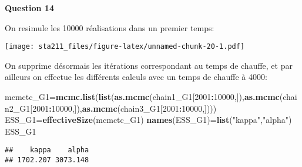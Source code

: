 \documentclass[
]{article}
\newenvironment{Shaded}{\begin{snugshade}}{\end{snugshade}}
\newcommand{\DecValTok}[1]{\textcolor[rgb]{0.00,0.00,0.81}{#1}}
\newcommand{\FloatTok}[1]{\textcolor[rgb]{0.00,0.00,0.81}{#1}}
\newcommand{\KeywordTok}[1]{\textcolor[rgb]{0.13,0.29,0.53}{\textbf{#1}}}
\newcommand{\NormalTok}[1]{#1}
\newcommand{\OperatorTok}[1]{\textcolor[rgb]{0.81,0.36,0.00}{\textbf{#1}}}
\newcommand{\StringTok}[1]{\textcolor[rgb]{0.31,0.60,0.02}{#1}}
\begin{document}
\textbf{Question 14}

On resimule les 10000 réalisations dans un premier temps:

\begin{Shaded}
\end{Shaded}

\texttt{[image: sta211\_files/figure-latex/unnamed-chunk-20-1.pdf]}

On supprime désormais les itérations correspondant au temps de chauffe,
et par ailleurs on effectue les différents calculs avec un temps de
chauffe à 4000:

\begin{Shaded}
\begin{Highlighting}[]
\NormalTok{mcmctc_G1=}\KeywordTok{mcmc.list}\NormalTok{(}\KeywordTok{list}\NormalTok{(}\KeywordTok{as.mcmc}\NormalTok{(chain1_G1[}\DecValTok{2001}\OperatorTok{:}\DecValTok{10000}\NormalTok{,]),}\KeywordTok{as.mcmc}\NormalTok{(chain2_G1[}\DecValTok{2001}\OperatorTok{:}\DecValTok{10000}\NormalTok{,]),}\KeywordTok{as.mcmc}\NormalTok{(chain3_G1[}\DecValTok{2001}\OperatorTok{:}\DecValTok{10000}\NormalTok{,])))}
\NormalTok{ESS_G1=}\KeywordTok{effectiveSize}\NormalTok{(mcmctc_G1)}
\KeywordTok{names}\NormalTok{(ESS_G1)=}\KeywordTok{list}\NormalTok{(}\StringTok{"kappa"}\NormalTok{,}\StringTok{"alpha"}\NormalTok{)}
\NormalTok{ESS_G1}
\end{Highlighting}
\end{Shaded}

\begin{verbatim}
##    kappa    alpha 
## 1702.207 3073.148
\end{verbatim}
\end{document}
